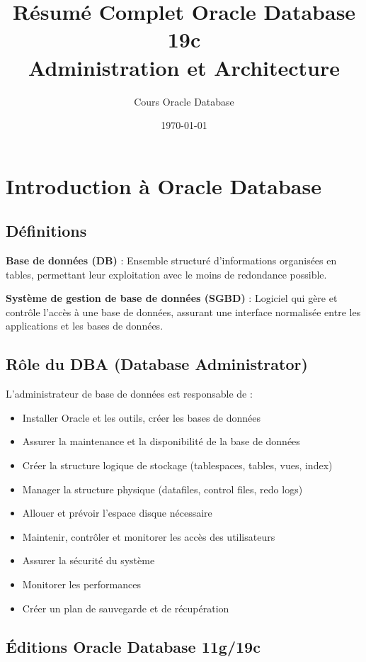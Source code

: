 \documentclass[12pt,a4paper]{article}
\title{\textbf{Résumé Complet Oracle Database 19c}\\
Administration et Architecture}
\author{Cours Oracle Database}
\date{\today}
\begin{document}
\maketitle
\tableofcontents
\newpage

\section{Introduction à Oracle Database}

\subsection{Définitions}

\textbf{Base de données (DB)} : Ensemble structuré d'informations organisées en tables, permettant leur exploitation avec le moins de redondance possible.

\textbf{Système de gestion de base de données (SGBD)} : Logiciel qui gère et contrôle l'accès à une base de données, assurant une interface normalisée entre les applications et les bases de données.

\subsection{Rôle du DBA (Database Administrator)}

L'administrateur de base de données est responsable de :
\begin{itemize}
    \item Installer Oracle et les outils, créer les bases de données
    \item Assurer la maintenance et la disponibilité de la base de données
    \item Créer la structure logique de stockage (tablespaces, tables, vues, index)
    \item Manager la structure physique (datafiles, control files, redo logs)
    \item Allouer et prévoir l'espace disque nécessaire
    \item Maintenir, contrôler et monitorer les accès des utilisateurs
    \item Assurer la sécurité du système
    \item Monitorer les performances
    \item Créer un plan de sauvegarde et de récupération
\end{itemize}

\subsection{Éditions Oracle Database 11g/19c}
\end{document}
